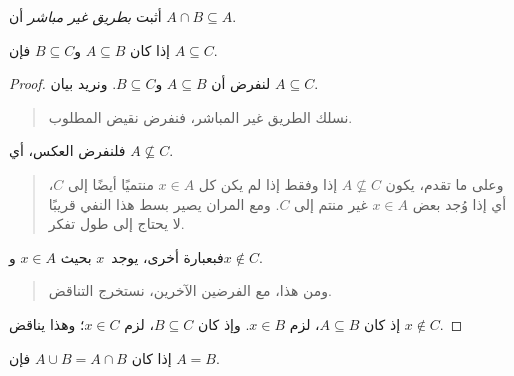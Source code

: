 \documentclass[../../../include/open-logic-section]{subfiles}
\begin{document}
\begin{prob}
أثبت \emph{بطريق غير مباشر} أن $A \cap B \subseteq A$.
\end{prob}

\begin{prop}
إذا كان $A \subseteq B$ و$B \subseteq C$ فإن $A \subseteq C$.
\end{prop}

\begin{proof}
  لنفرض أن $A \subseteq B$ و$B \subseteq C$. ونريد بيان
  $A \subseteq C$.
  \begin{quote}
    نسلك الطريق غير المباشر، فنفرض نقيض المطلوب.
  \end{quote}
  فلنفرض العكس، أي $A \nsubseteq C$.
  \begin{quote}
    وعلى ما تقدم، يكون $A \nsubseteq C$ إذا وفقط إذا لم يكن كل
    $x \in A$ منتميًا أيضًا إلى $C$، أي إذا وُجد بعض $x \in A$ غير
    منتم إلى $C$. ومع المران يصير بسط هذا النفي قريبًا لا يحتاج إلى
    طول تفكر.
  \end{quote}
  فبعبارة أخرى، يوجد~$x$ بحيث $x \in A$ و$x \notin C$.
  \begin{quote}
    ومن هذا، مع الفرضين الآخرين، نستخرج التناقض.
  \end{quote}
  إذ كان $A \subseteq B$، لزم $x \in B$. وإذ كان $B \subseteq C$،
  لزم $x \in C$؛ وهذا يناقض $x \notin C$.
\end{proof}

\begin{prop}
إذا كان $A \cup B = A \cap B$ فإن $A = B$.
\end{prop}
\end{document}
